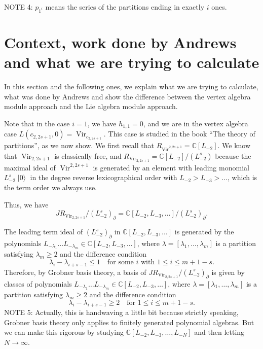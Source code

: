 \documentclass[a4paper, 12pt, reqno]{amsart}
\DeclareMathOperator{\Vir}{Vir}
\DeclareMathOperator{\vac}{|0\rangle}
\begin{document}
NOTE 4: $p_{1^i}$ means the series of the partitions ending in exactly $i$ ones.

\section{Context, work done by Andrews and what we are trying to calculate}
\label{sec:context-work-done}

In this section and the following ones, we explain what we are trying to calculate, what was done by Andrews and show the difference between the vertex algebra module approach and the Lie algebra module approach.

Note that in the case $i = 1$, we have $h_{1, 1} = 0$, and we are in the vertex algebra case $L(c_{2, 2s + 1}, 0) = \Vir_{c_{2, 2s + 1}}$.
This case is studied in the book ``The theory of partitions'', as we now show.
We first recall that $R_{\Vir^{2, 2s + 1}} = \mathbb{C}[L_{-2}]$.
We know that $\Vir_{2, 2s + 1}$ is classically free, and $R_{\Vir_{2, 2s + 1}} = \mathbb{C}[L_{-2}]/(L_{-2}^s)$ because the maximal ideal of $\Vir^{2, 2s + 1}$ is generated by an element with leading monomial $L_{-2}^s\vac$ in the degree reverse lexicographical order with $L_{-2} > L_{-3} > \dots$, which is the term order we always use.

Thus, we have 
\begin{equation*}
  JR_{\Vir_{2, 2s + 1}}/(L_{-2}^s)_{\partial} = \mathbb{C}[L_{-2}, L_{-3}, \dots]/(L_{-2}^s)_{\partial}.
\end{equation*}

The leading term ideal of $(L_{-2}^s)_{\partial}$ in $\mathbb{C}[L_{-2}, L_{-3}, \dots]$ is generated by the polynomials $L_{-\lambda_1} \dots L_{-\lambda_m} \in \mathbb{C}[L_{-2}, L_{-3}, \dots]$, where $\lambda = [\lambda_1, \dots, \lambda_m]$ is a partition satisfying $\lambda_m \ge 2$ and the difference condition
\begin{equation}
  \label{eq:1}
  \lambda_i - \lambda_{i + s - 1} \le 1 \quad \text{for some $i$ with $1 \le i \le m + 1 - s$}.
\end{equation}
Therefore, by Grobner basis theory, a basis of $JR_{\Vir_{2, 2s + 1}}/(L_{-2}^s)_{\partial}$ is given by classes of polynomials $L_{-\lambda_1} \dots L_{-\lambda_m} \in \mathbb{C}[L_{-2}, L_{-3}, \dots]$, where $\lambda = [\lambda_1, \dots, \lambda_m]$ is a partition satisfying $\lambda_m \ge 2$ and the difference condition
\begin{equation}
  \label{eq:2}
  \lambda_i - \lambda_{i + s - 1} \ge 2 \quad \text{for $1 \le i \le m + 1 - s$}.
\end{equation}
NOTE 5: Actually, this is handwaving a little bit because strictly speaking, Grobner basis theory only applies to finitely generated polynomial algebras.
But we can make this rigorous by studying $\mathbb{C}[L_{-2}, L_{-3}, \dots, L_{-N}]$ and then letting $N \to \infty$.
\end{document}
